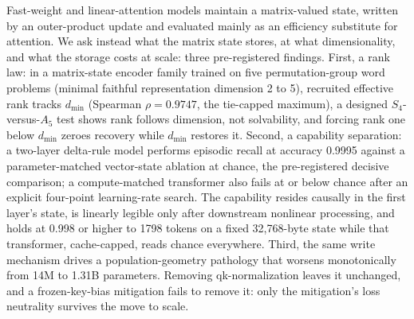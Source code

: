 Fast-weight and linear-attention models maintain a matrix-valued state,
written by an outer-product update and evaluated mainly as an
efficiency substitute for attention. We ask instead what the matrix
state stores, at what dimensionality, and what the storage costs at
scale: three pre-registered findings. First, a rank law: in a matrix-state encoder
family trained on five permutation-group word problems (minimal
faithful representation dimension 2 to 5), recruited effective rank
tracks $d_{\min}$ (Spearman $\rho=0.9747$, the
tie-capped maximum), a designed $S_4$-versus-$A_5$ test shows rank
follows dimension, not solvability, and
forcing rank one below $d_{\min}$ zeroes recovery while $d_{\min}$
restores it. Second, a
capability separation: a two-layer delta-rule model performs episodic
recall at accuracy 0.9995 against a
parameter-matched vector-state ablation at chance, the pre-registered
decisive comparison; a compute-matched transformer also fails at or
below chance after an explicit four-point learning-rate search. The
capability resides causally in the first layer's state, is linearly
legible only after downstream nonlinear processing, and holds at 0.998 or higher to 1798 tokens on
a fixed 32,768-byte state while that transformer, cache-capped, reads
chance everywhere. Third, the same write
mechanism drives a population-geometry pathology that worsens
monotonically from 14M to 1.31B parameters.
Removing qk-normalization leaves it unchanged, and a frozen-key-bias mitigation fails to
remove it: only the mitigation's loss neutrality survives the move to
scale.


